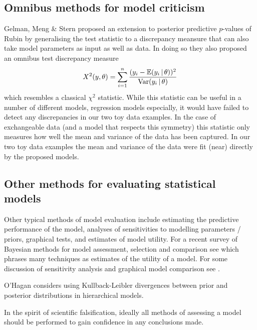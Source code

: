 \documentclass{article} %
\begin{document}
\subsection{Omnibus methods for model criticism}

Gelman, Meng \& Stern \citep{Gelman1996-ez} proposed an extension to posterior predictive $p$-values of Rubin \citep{Rubin1984-tw} by generalising the test statistic to a discrepancy meansure that can also take model parameters as input as well as data.
In doing so they also proposed an omnibus test discrepancy measure
\begin{equation}
  X^2(y,\theta) = \sum_{i=1}^n \frac{(y_i-\mathbb{E}(y_i\,|\,\theta))^2}{\textrm{Var}(y_i\,|\,\theta)}
\end{equation}
which resembles a classical $\chi^2$ statistic.
While this statistic can be useful in a number of different models, regression models especially, it would have failed to detect any discrepancies in our two toy data examples.
In the case of exchangeable data (and a model that respects this symmetry) this statistic only measures how well the mean and variance of the data has been captured.
In our two toy data examples the mean and variance of the data were fit (near) directly by the proposed models.

\subsection{Other methods for evaluating statistical models}

Other typical methods of model evaluation include estimating the predictive performance of the model, analyses of sensitivities to modelling parameters / priors, graphical tests, and estimates of model utility.
For a recent survey of Bayesian methods for model assessment, selection and comparison see \cite{Vehtari2012-oh} which phrases many techniques as estimates of the utility of a model.
For some discussion of sensitivity analysis and graphical model comparison see \citep[e.g.][]{Gelman2013-st}.

O'Hagan \citep{OHagan2003-bc} considers using Kullback-Leibler divergences between prior and posterior distributions in hierarchical models.

In the spirit of scientific falsification, ideally all methods of assessing a model should be performed to gain confidence in any conclusions made.
\end{document}
